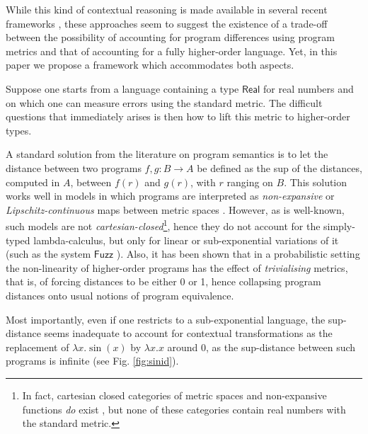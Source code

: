   While this kind of contextual reasoning is made available in several recent frameworks \cite{10.1145/1932681.1863568,Gaboardi_2013,Azevedo_de_Amorim_2017,chaudhuri, dallago:differential-stlc},  these approaches seem to suggest the existence of a trade-off between the possibility of accounting for 
program differences using program metrics and that of accounting for  a fully higher-order language. Yet, in this paper we propose a framework which accommodates both aspects. 

%

Suppose one starts from a language  containing a type $\mathsf{Real}$ for real numbers and on which one can measure errors using the standard metric. The difficult questions that immediately arises is then how to lift this metric to higher-order types.



A standard solution from the literature on program semantics is to let the distance between two programs  $f,g:B\to A$ be defined as the sup of the distances, computed in $A$, between $f(r)$ and $g(r)$, with $r$ ranging on $B$.
This solution works well in models in which programs are interpreted as \emph{non-expansive} or \emph{Lipschitz-continuous} maps between metric spaces \cite{Hofmann2014, Azevedo_de_Amorim_2017}. However, as is well-known, such models are not \emph{cartesian-closed}\footnote{In fact, cartesian closed categories of metric spaces and non-expansive functions \emph{do} exist \cite{Escardo1999, Stubbe2009}, but none of these categories contain real numbers with the standard metric.}, hence they do not account for 
 the simply-typed lambda-calculus, but only for linear or sub-exponential variations of it (such as the system $\mathsf{Fuzz}$ \cite{10.1145/1932681.1863568,Gaboardi_2013,Azevedo_de_Amorim_2017}).
 Also, it has been shown \cite{10.1109/LICS.2015.64} that in a probabilistic setting the non-linearity of higher-order programs has the effect of \emph{trivialising} metrics, that is, of forcing distances to be either 0 or 1, hence collapsing program distances onto usual notions of program equivalence.


Most importantly, even if one restricts to a sub-exponential language, the sup-distance seems inadequate to account for contextual transformations as the replacement of $\lambda x.\sin(x)$ by $\lambda x.x$ around 0,  as the sup-distance between such programs is infinite (see Fig. \ref{fig:sinid}). 
 
